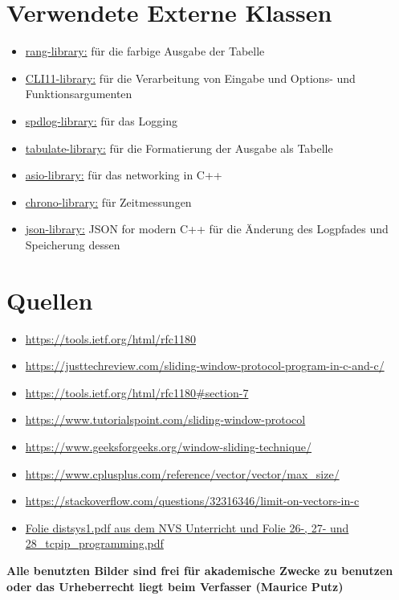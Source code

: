 \documentclass{article}
\begin{document}
\break

\section{Verwendete Externe Klassen}
\begin{itemize}
	\item \underline{rang-library:} für die farbige Ausgabe der Tabelle
	\item \underline{CLI11-library:} für die Verarbeitung von Eingabe und Options- und Funktionsargumenten
	\item \underline{spdlog-library:} für das Logging
	\item \underline{tabulate-library:} für die Formatierung der Ausgabe als Tabelle
	\item \underline{asio-library:} für das networking in C++
	\item \underline{chrono-library:} für Zeitmessungen
	\item \underline{json-library:} JSON for modern C++ für die Änderung des Logpfades und Speicherung dessen
\end{itemize}


\section{Quellen}

\begin{itemize}
	\item \underline{https://tools.ietf.org/html/rfc1180}
	\item \underline{https://justtechreview.com/sliding-window-protocol-program-in-c-and-c/}
	\item \underline{https://tools.ietf.org/html/rfc1180\#section-7}
	\item \underline{https://www.tutorialspoint.com/sliding-window-protocol}
	\item \underline{https://www.geeksforgeeks.org/window-sliding-technique/}
	\item \underline{https://www.cplusplus.com/reference/vector/vector/max\_size/}
	\item \underline{https://stackoverflow.com/questions/32316346/limit-on-vectors-in-c}
	\item \underline{Folie distsys1.pdf aus dem NVS Unterricht und Folie 26-, 27- und 28\_tcpip\_programming.pdf}
\end{itemize}

\textbf{Alle benutzten Bilder sind frei für akademische Zwecke zu benutzen oder das Urheberrecht liegt beim Verfasser (Maurice Putz)}
\end{document}

